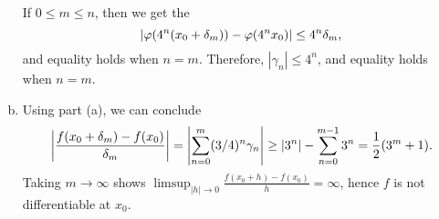 \begin{pb}[4]
\begin{soln}
\begin{enumerate}[(a)]
        If \(0 \leq m \leq n\), then we get the 
        \begin{equation*}
            \abs{\varphi(4^n(x_0 + \delta_m)) - \varphi(4^n x_0)} \leq 4^n \delta_m,
        \end{equation*}
        and equality holds when \(n = m\).
        Therefore, \(|\gamma_n| \leq 4^n\), and equality holds when \(n = m\).
    
    \item
        Using part (a), we can conclude
        \begin{equation*}
            \abs{\frac{f(x_0 + \delta_m) - f(x_0)}{\delta_m}}
            = \abs{\sum_{n = 0}^{m} (3/4)^n \gamma_n}
            \geq |3^n| - \sum_{n = 0}^{m - 1} 3^n
            = \frac{1}{2}(3^m + 1).
        \end{equation*}
        Taking \(m \to \infty\) shows
        \(\limsup_{|h| \to 0} \frac{f(x_0 + h) - f(x_0)}{h} = \infty\),
        hence \(f\) is not differentiable at \(x_0\).
        

    \end{enumerate} 

\end{soln}
\end{pb}
